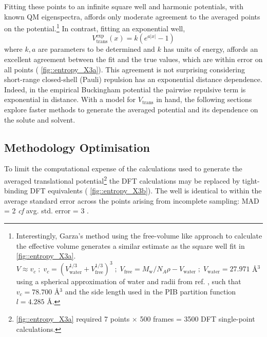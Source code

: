 \documentclass[../main.tex]{subfiles}
\begin{document}
Fitting these points to an infinite square well and harmonic potentials, with known QM eigenspectra, affords only moderate agreement to the averaged points on the potential.\footnote{Interestingly, Garza's method using the free-volume like approach to calculate the effective volume generates a similar estimate as the square well fit in \figurename{ \ref{fig::entropy_X3a}}. $V \approx v_c \; ; \; v_c = (V_\text{water}^{1/3} + V_\text{free}^{1/3})^3 \; ; \; V_\text{free} = M_\text{w} / N_A \rho - V_\text{water} \; ;\; V_\text{water} = 27.971$ \AA${}^3$ using a spherical approximation of water and radii from ref. \cite{CRC}
, such that $v_c = 78.700$ \AA${}^3$ and the side length used in the PIB partition function $l = 4.285$ \AA.} In contrast, fitting an exponential well,
\begin{equation}
V_\text{trans}^\text{exp}(x) = k (e^{a|x|} - 1)
\end{equation}
where $k, a$ are parameters to be determined and $k$ has units of energy, affords an excellent agreement between the fit and the true values, which are within error on all points (\figurename{ \ref{fig::entropy_X3a}}). This agreement is not surprising considering short-range closed-shell (Pauli) repulsion has an exponential distance dependence.\cite{Bolliger2013} Indeed, in the empirical Buckingham potential %
the pairwise repulsive term is exponential in distance.\cite{Buckingham1938} With a model for $V_\text{trans}$ in hand, the following sections explore faster methods to generate the averaged potential and its dependence on the solute and solvent.

\newpage
\subsection{Methodology Optimisation}
To limit the computational expense of the calculations used to generate the averaged translational potential\footnote{\figurename{ \ref{fig::entropy_X3a}} required 7 points $\times$ 500 frames = 3500 DFT single-point calculations.} the DFT calculations may be replaced by tight-binding DFT equivalents (\figurename{ \ref{fig::entropy_X3b}}). The well is identical to within the average standard error across the points arising from incomplete sampling: MAD = 2 \kcal \emph{ cf} avg. std. error = 3 \kcal.
\end{document}
